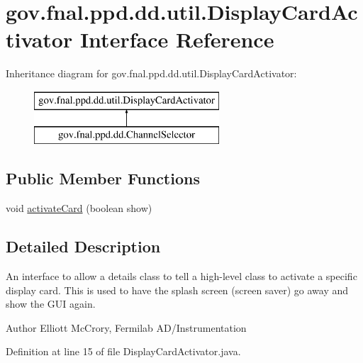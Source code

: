 \hypertarget{interfacegov_1_1fnal_1_1ppd_1_1dd_1_1util_1_1DisplayCardActivator}{\section{gov.\-fnal.\-ppd.\-dd.\-util.\-Display\-Card\-Activator Interface Reference}
\label{interfacegov_1_1fnal_1_1ppd_1_1dd_1_1util_1_1DisplayCardActivator}
}
Inheritance diagram for gov.\-fnal.\-ppd.\-dd.\-util.\-Display\-Card\-Activator\-:\begin{figure}[H]
\begin{center}
\leavevmode
\includegraphics[height=2.000000cm]{interfacegov_1_1fnal_1_1ppd_1_1dd_1_1util_1_1DisplayCardActivator}
\end{center}
\end{figure}
\subsection*{Public Member Functions}
\begin{DoxyCompactItemize}
\item 
void \hyperlink{interfacegov_1_1fnal_1_1ppd_1_1dd_1_1util_1_1DisplayCardActivator_a6502375a378f23e57662be587ee75f02}{activate\-Card} (boolean show)
\end{DoxyCompactItemize}


\subsection{Detailed Description}
An interface to allow a details class to tell a high-\/level class to activate a specific display card. This is used to have the splash screen (screen saver) go away and show the G\-U\-I again.

\begin{DoxyAuthor}{Author}
Elliott Mc\-Crory, Fermilab A\-D/\-Instrumentation 
\end{DoxyAuthor}


Definition at line 15 of file Display\-Card\-Activator.\-java.



